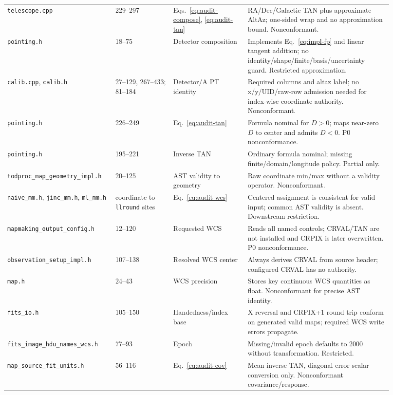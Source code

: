 \documentclass[11pt]{article}
\newcommand{\code}[1]{\nolinkurl{#1}}
\begin{document}
\begin{longtable}{L{0.25\linewidth}L{0.14\linewidth}L{0.18\linewidth}L{0.35\linewidth}}
\code{telescope.cpp} & 229--297 & Eqs.~\eqref{eq:audit-compose}, \eqref{eq:audit-tan} & RA/Dec/Galactic TAN plus approximate AltAz; one-sided wrap and no approximation bound. Nonconformant. \\
\code{pointing.h} & 18--75 & Detector composition & Implements Eq.~\eqref{eq:impl-fp} and linear tangent addition; no identity/shape/finite/basis/uncertainty guard. Restricted approximation. \\
\code{calib.cpp}, \code{calib.h} & 27--129, 267--433; 81--184 & Detector/A PT identity & Required columns and altaz label; no x/y/UID/raw-row admission needed for index-wise coordinate authority. Nonconformant. \\
\code{pointing.h} & 226--249 & Eq.~\eqref{eq:audit-tan} & Formula nominal for $D>0$; maps near-zero $D$ to center and admits $D<0$. P0 nonconformance. \\
\code{pointing.h} & 195--221 & Inverse TAN & Ordinary formula nominal; missing finite/domain/longitude policy. Partial only. \\
\code{todproc_map_geometry_impl.h} & 20--125 & AST validity to geometry & Raw coordinate min/max without a validity operator. Nonconformant. \\
\code{naive_mm.h}, \code{jinc_mm.h}, \code{ml_mm.h} & coordinate-to-\code{llround} sites & Eq.~\eqref{eq:audit-wcs} & Centered assignment is consistent for valid input; common AST validity is absent. Downstream restriction. \\
\code{mapmaking_output_config.h} & 12--120 & Requested WCS & Reads all named controls; CRVAL/TAN are not installed and CRPIX is later overwritten. P0 nonconformance. \\
\code{observation_setup_impl.h} & 107--138 & Resolved WCS center & Always derives CRVAL from source header; configured CRVAL has no authority. \\
\code{map.h} & 24--43 & WCS precision & Stores key continuous WCS quantities as float. Nonconformant for precise AST identity. \\
\code{fits_io.h} & 105--150 & Handedness/index base & X reversal and CRPIX+1 round trip conform on generated valid maps; required WCS write errors propagate. \\
\code{fits_image_hdu_names_wcs.h} & 77--93 & Epoch & Missing/invalid epoch defaults to 2000 without transformation. Restricted. \\
\code{map_source_fit_units.h} & 56--116 & Eq.~\eqref{eq:audit-cov} & Mean inverse TAN, diagonal error scalar conversion only. Nonconformant covariance/response. \\

\end{longtable}
\end{document}
